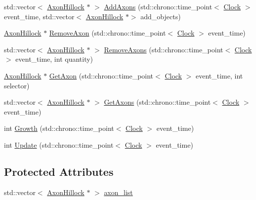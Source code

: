 \begin{DoxyCompactItemize}
\item 
std\+::vector$<$ \mbox{\hyperlink{classAxonHillock}{Axon\+Hillock}} $\ast$ $>$ \mbox{\hyperlink{classAxonHillock_a54a82227b96757f1c0d7450df6a3df37}{Add\+Axons}} (std\+::chrono\+::time\+\_\+point$<$ \mbox{\hyperlink{universe_8h_a0ef8d951d1ca5ab3cfaf7ab4c7a6fd80}{Clock}} $>$ event\+\_\+time, std\+::vector$<$ \mbox{\hyperlink{classAxonHillock}{Axon\+Hillock}} $\ast$$>$ add\+\_\+objects)
\item 
\mbox{\hyperlink{classAxonHillock}{Axon\+Hillock}} $\ast$ \mbox{\hyperlink{classAxonHillock_ae7c379ef3a70c8a43a0f105ccc94b54b}{Remove\+Axon}} (std\+::chrono\+::time\+\_\+point$<$ \mbox{\hyperlink{universe_8h_a0ef8d951d1ca5ab3cfaf7ab4c7a6fd80}{Clock}} $>$ event\+\_\+time)
\item 
std\+::vector$<$ \mbox{\hyperlink{classAxonHillock}{Axon\+Hillock}} $\ast$ $>$ \mbox{\hyperlink{classAxonHillock_a7f10edff727271408887d29a70e7e671}{Remove\+Axons}} (std\+::chrono\+::time\+\_\+point$<$ \mbox{\hyperlink{universe_8h_a0ef8d951d1ca5ab3cfaf7ab4c7a6fd80}{Clock}} $>$ event\+\_\+time, int quantity)
\item 
\mbox{\hyperlink{classAxonHillock}{Axon\+Hillock}} $\ast$ \mbox{\hyperlink{classAxonHillock_a08fde7d1b8a40ba7a052315f95b743f0}{Get\+Axon}} (std\+::chrono\+::time\+\_\+point$<$ \mbox{\hyperlink{universe_8h_a0ef8d951d1ca5ab3cfaf7ab4c7a6fd80}{Clock}} $>$ event\+\_\+time, int selector)
\item 
std\+::vector$<$ \mbox{\hyperlink{classAxonHillock}{Axon\+Hillock}} $\ast$ $>$ \mbox{\hyperlink{classAxonHillock_af35663768cbe818e092382519a6d73e3}{Get\+Axons}} (std\+::chrono\+::time\+\_\+point$<$ \mbox{\hyperlink{universe_8h_a0ef8d951d1ca5ab3cfaf7ab4c7a6fd80}{Clock}} $>$ event\+\_\+time)
\item 
int \mbox{\hyperlink{classAxonHillock_a5c5cd9008f1410898980528b959d668e}{Growth}} (std\+::chrono\+::time\+\_\+point$<$ \mbox{\hyperlink{universe_8h_a0ef8d951d1ca5ab3cfaf7ab4c7a6fd80}{Clock}} $>$ event\+\_\+time)
\item 
int \mbox{\hyperlink{classAxonHillock_a5a6a6a93a98b32c303b9ee6320c09909}{Update}} (std\+::chrono\+::time\+\_\+point$<$ \mbox{\hyperlink{universe_8h_a0ef8d951d1ca5ab3cfaf7ab4c7a6fd80}{Clock}} $>$ event\+\_\+time)
\end{DoxyCompactItemize}
\subsection*{Protected Attributes}
\begin{DoxyCompactItemize}
\item 
std\+::vector$<$ \mbox{\hyperlink{classAxonHillock}{Axon\+Hillock}} $\ast$ $>$ \mbox{\hyperlink{classAxonHillock_a110d655ded8e09306b224b6e940cd60b}{axon\+\_\+list}}
\end{DoxyCompactItemize}

